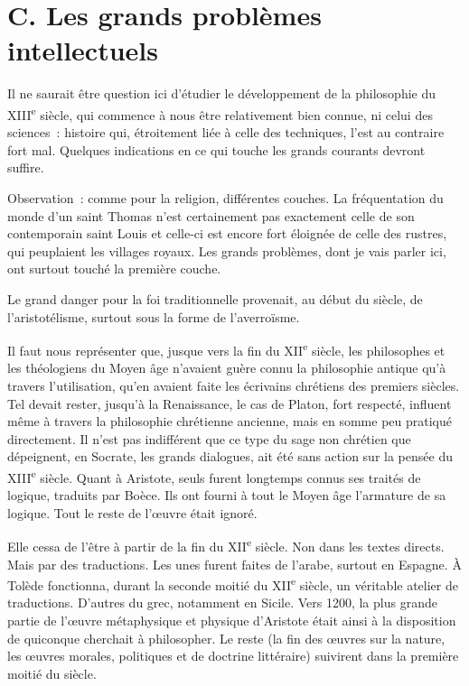 \documentclass[french,twoside]{book} %
\begin{document}
\section[{C. Les grands problèmes intellectuels }]{C. Les grands problèmes intellectuels \protect\footnotemark }
\label{c11c}
\noindent Il ne saurait être question ici d’étudier le développement de la philosophie du XIII\textsuperscript{e} siècle, qui commence à nous être relativement bien connue, ni celui des sciences : histoire qui, étroitement liée à celle des techniques, l’est au contraire fort mal. Quelques indications en ce qui touche les grands courants devront suffire.\par
Observation : comme pour la religion, différentes couches. La fréquentation du monde d’un saint Thomas n’est certainement pas exactement celle de son contemporain saint Louis et celle-ci est encore fort éloignée de celle des rustres, qui peuplaient les villages royaux. Les grands problèmes, dont je vais parler ici, ont surtout touché la première couche.\par
Le grand danger pour la foi traditionnelle provenait, au début du siècle, de l’aristotélisme, surtout sous la forme de l’averroïsme.\par
\label{p119} Il faut nous représenter que, jusque vers la fin du XII\textsuperscript{e} siècle, les philosophes et les théologiens du Moyen âge n’avaient guère connu la philosophie antique qu’à travers l’utilisation, qu’en avaient faite les écrivains chrétiens des premiers siècles. Tel devait rester, jusqu’à la Renaissance, le cas de Platon, fort respecté, influent même à travers la philosophie chrétienne ancienne, mais en somme peu pratiqué directement. Il n’est pas indifférent que ce type du sage non chrétien que dépeignent, en Socrate, les grands dialogues, ait été sans action sur la pensée du XIII\textsuperscript{e} siècle. Quant à Aristote, seuls furent longtemps connus ses traités de logique, traduits par Boèce. Ils ont fourni à tout le Moyen âge l’armature de sa logique. Tout le reste de l’œuvre était ignoré.\par
Elle cessa de l’être à partir de la fin du XII\textsuperscript{e} siècle. Non dans les textes directs. Mais par des traductions. Les unes furent faites de l’arabe, surtout en Espagne. À Tolède fonctionna, durant la seconde moitié du XII\textsuperscript{e} siècle, un véritable atelier de traductions. D’autres du grec, notamment en Sicile. Vers 1200, la plus grande partie de l’œuvre métaphysique et physique d’Aristote était ainsi à la disposition de quiconque cherchait à philosopher. Le reste (la fin des œuvres sur la nature, les œuvres morales, politiques et de doctrine littéraire) suivirent dans la première moitié du siècle.\par
\end{document}
